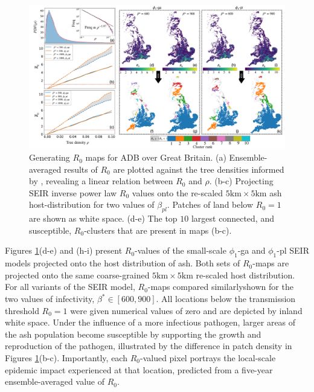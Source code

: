 \begin{landscape}
\begin{figure}
    \centering
    \includegraphics[scale=0.38]{chapter6/figures/fig6-R0-map-generation.pdf}
    \caption{Generating $R_0$ maps for ADB over Great Britain. (a) Ensemble-averaged results of $R_0$ are plotted against the tree densities informed by \cite{hill.data}, revealing a linear relation between $R_0$ and $\rho$. (b-c) Projecting SEIR inverse power law $R_0$ values onto the re-scaled $5\mathrm{km} \times 5 \mathrm{km}$ ash host-distribution for two values of $\beta_{pl}$. Patches of land below $R_0 = 1$ are shown as white space. (d-e) The top $10$ largest connected, and susceptible, $R_0$-clusters that are present in maps (b-c).}
    \label{fig:R0-map-generation}
\end{figure}
\end{landscape}

Figures \ref{fig:R0-map-generation}(d-e) and (h-i) present $R_0$-values of the small-scale $\phi_1$-ga and $\phi_1$-pl SEIR models projected onto the host distribution of ash.
Both sets of $R_0$-maps are projected onto the same coarse-grained $5\mathrm{km} \times 5\mathrm{km}$ re-scaled host distribution.
For all variants of the SEIR model, $R_0$-maps compared similarly\textemdash shown for the two values of infectivity, $\beta^* \in [600, 900]$.
All locations below the transmission threshold $R_0=1$ were given numerical values of zero and are depicted by inland white space.
Under the influence of a more infectious pathogen, larger areas of the ash population become susceptible by supporting the growth and reproduction of the pathogen, illustrated by the difference in patch density in Figures \ref{fig:R0-map-generation}(b-c). 
Importantly, each $R_0$-valued pixel portrays the local-scale epidemic impact experienced at that location, predicted from a five-year ensemble-averaged value of $R_0$.

